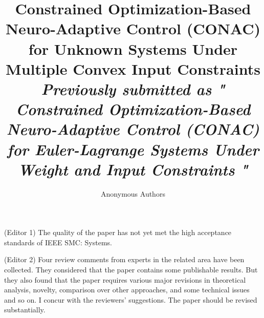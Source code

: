 \documentclass[12pt,english]{reviewresponse}
\title{
  Constrained Optimization-Based Neuro-Adaptive Control (CONAC) for Unknown Systems Under Multiple Convex Input Constraints
  \\
  \textit{
  \small{
    Previously submitted as "
	  Constrained Optimization-Based Neuro-Adaptive Control (CONAC) for Euler-Lagrange Systems Under Weight and Input Constraints
  "
  }
  }
}
\author{
	Anonymous Authors
}
\begin{document}
\maketitle



% 

\newpage
\tableofcontents

\editor

\begin{generalcomment}

  (Editor 1) The quality of the paper has not yet met the high acceptance standards of IEEE SMC: Systems.

  (Editor 2) Four review comments from experts in the related area have been collected. They considered that the paper contains some publishable results. But they also found that the paper requires various major revisions in theoretical analysis, novelty, comparison over other approaches, and some technical issues and so on. I concur with the reviewers' suggestions. The paper should be revised substantially.

\end{generalcomment}
\end{document}

